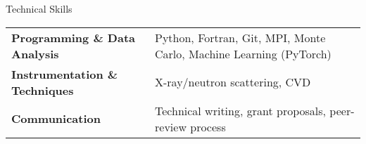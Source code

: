 
\begin{rubric}{Technical Skills}
\begin{tabular}{@{}ll@{}}
\textbf{Programming \& Data Analysis} & Python, Fortran, Git, MPI, Monte Carlo, Machine Learning (PyTorch) \\
\textbf{Instrumentation \& Techniques} & X-ray/neutron scattering, CVD\\
\textbf{Communication} & Technical writing, grant proposals, peer-review process\\
\end{tabular}
\end{rubric}

